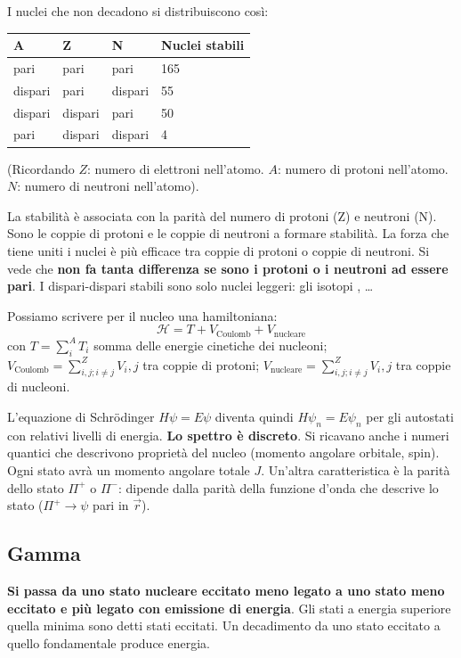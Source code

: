 \documentclass[a4paper,11pt,twoside,openany]{book}
\theoremstyle{definition}
\theoremstyle{plain}
\theoremstyle{plain}
\theoremstyle{definition}
\begin{document}
I nuclei che non decadono si distribuiscono così:

\begin{center}\begin{tabularx}{\textwidth}{XXXX}
\toprule
A & Z & N & Nuclei stabili\\
\midrule
pari & pari & pari & 165 \\
dispari & pari & dispari & 55 \\
dispari & dispari & pari & 50 \\
pari & dispari & dispari & 4 \\
\bottomrule
\end{tabularx}\end{center}
(Ricordando $Z$: numero di elettroni nell'atomo. $A$: numero di protoni nell'atomo. $N$: numero di neutroni nell'atomo).

La stabilità è associata con la parità del numero di protoni (Z) e neutroni (N). Sono le coppie di protoni e le coppie di neutroni a formare stabilità. La forza che tiene uniti i nuclei è più efficace tra coppie di protoni o coppie di neutroni. Si vede che \textbf{non fa tanta differenza se sono i protoni o i neutroni ad essere pari}. I dispari-dispari stabili sono solo nuclei leggeri: gli isotopi ,  \dots

Possiamo scrivere per il nucleo una hamiltoniana:
\begin{equation}
\mathcal{H}=T+V_{\textrm{Coulomb}}+V_{\textrm{nucleare}}
\end{equation}
con $T=\sum^A_i{T_i}$ somma delle energie cinetiche dei nucleoni; $V_{\textrm{Coulomb}}=\sum^Z_{i,j;i\neq j}{V_i,j}$ tra coppie di protoni; $V_{\textrm{nucleare}}=\sum^Z_{i,j;i\neq j}{V_i,j}$ tra coppie di nucleoni.

L'equazione di Schrödinger $H\psi=E\psi$ diventa quindi $H\psi_n=E\psi_n$ per gli autostati con relativi livelli di energia. \textbf{Lo spettro è discreto}. Si ricavano anche i numeri quantici che descrivono proprietà del nucleo (momento angolare orbitale, spin). Ogni stato avrà un momento angolare totale $J$. Un'altra caratteristica è la parità dello stato $\Pi^+$ o $\Pi^-$: dipende dalla parità della funzione d'onda che descrive lo stato ($\Pi^+ \rightarrow \psi$ pari in $\vec r$).

\subsection{Gamma} %
\textbf{Si passa da uno stato nucleare eccitato meno legato a uno stato meno eccitato e più legato con emissione di energia}. Gli stati a energia superiore quella minima sono detti stati eccitati. Un decadimento da uno stato eccitato a quello fondamentale produce energia.
\end{document}
